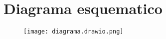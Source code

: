 \documentclass[../informe_krapp.tex]{subfiles}
\begin{document}
\section{Diagrama esquematico}
\begin{figure}[H]
	\texttt{[image: diagrama.drawio.png]}
	\centering

\end{figure}
\end{document}
